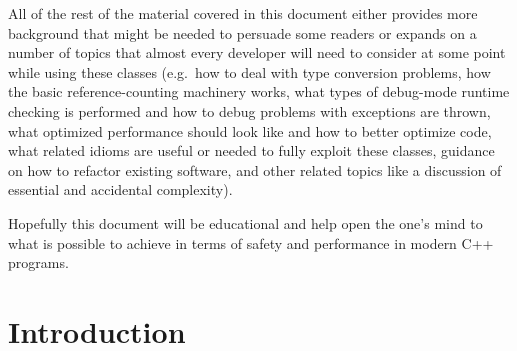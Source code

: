 \documentclass[pdf,ps2pdf,11pt]{SANDreport}
\begin{document}
All of the rest of the material covered in this document either
provides more background that might be needed to persuade some readers
or expands on a number of topics that almost every developer will need
to consider at some point while using these classes (e.g.\ how to deal
with type conversion problems, how the basic reference-counting
machinery works, what types of debug-mode runtime checking is
performed and how to debug problems with exceptions are thrown, what
optimized performance should look like and how to better optimize
code, what related idioms are useful or needed to fully exploit these
classes, guidance on how to refactor existing software, and other
related topics like a discussion of essential and accidental
complexity).

Hopefully this document will be educational and help open the one's
mind to what is possible to achieve in terms of safety and performance
in modern C++ programs.



%

\SANDmain %


%
\section{Introduction}
\label{sec:intro}
%

\end{document}
